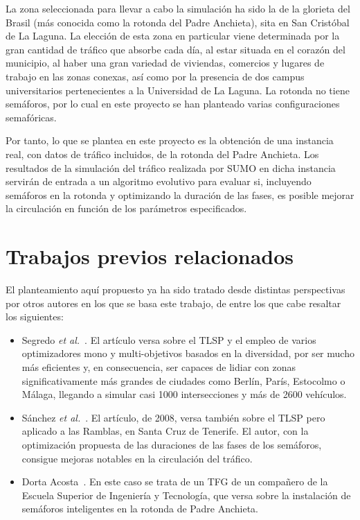 La zona seleccionada para llevar a cabo la simulación ha sido la de la glorieta del Brasil (más conocida como la rotonda del Padre Anchieta), sita en San Cristóbal de La Laguna. La elección de esta zona en particular viene determinada por la gran cantidad de tráfico que absorbe cada día, al estar situada en el corazón del municipio, al haber una gran variedad de viviendas, comercios y lugares de trabajo en las zonas conexas, así como por la presencia de dos campus universitarios pertenecientes a la Universidad de La Laguna. La rotonda no tiene semáforos, por lo cual en este proyecto se han planteado varias configuraciones semafóricas.

Por tanto, lo que se plantea en este proyecto es la obtención de una instancia real, con datos de tráfico incluidos, de la rotonda del Padre Anchieta. Los resultados de la simulación del tráfico realizada por SUMO en dicha instancia servirán de entrada a un algoritmo evolutivo para evaluar si, incluyendo semáforos en la rotonda y optimizando la duración de las fases, es posible mejorar la circulación en función de los parámetros especificados.


\section{Trabajos previos relacionados}

El planteamiento aquí propuesto ya ha sido tratado desde distintas perspectivas por otros autores en los que se basa este trabajo, de entre los que cabe resaltar los siguientes:

\begin{itemize}
    \item Segredo \textit{et al.}~\cite{segredo_optimising_2019}. El artículo versa sobre el TLSP y el empleo de varios optimizadores mono y multi-objetivos basados en la diversidad, por ser mucho más eficientes y, en consecuencia, ser capaces de lidiar con zonas significativamente más grandes de ciudades como Berlín, París, Estocolmo o Málaga, llegando a simular casi 1000 intersecciones y más de 2600 vehículos.
    \item Sánchez \textit{et al.}~\cite{sanchez_applying_2008}. El artículo, de 2008, versa también sobre el TLSP pero aplicado a las Ramblas, en Santa Cruz de Tenerife. El autor, con la optimización propuesta de las duraciones de las fases de los semáforos, consigue mejoras notables en la circulación del tráfico.
    \item Dorta Acosta~\cite{dorta_acosta_simulacion_2019}. En este caso se trata de un TFG de un compañero de la Escuela Superior de Ingeniería y Tecnología, que versa sobre la instalación de semáforos inteligentes en la rotonda de Padre Anchieta.
\end{itemize}

